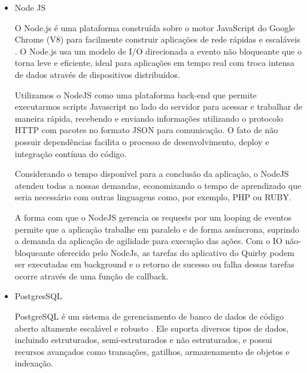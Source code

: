     \begin{itemize}
        \item Node JS
    
    O Node.js é uma plataforma construída sobre o motor JavaScript do Google Chrome (V8) para facilmente construir aplicações de rede rápidas e escaláveis \cite{nodejs_2019}. O Node.js usa um modelo de I/O direcionada a evento não bloqueante que o torna leve e eficiente, ideal para aplicações em tempo real com troca intensa de dados através de dispositivos distribuídos.
    
    Utilizamos o NodeJS como uma plataforma back-end que permite executarmos scripts Javascript no lado do servidor para acessar e trabalhar de maneira rápida, recebendo e enviando informações utilizando o protocolo HTTP com pacotes no formato JSON para comunicação. O fato de não possuir dependências facilita o processo de desenvolvimento, deploy e integração contínua do código.
    
    Considerando o tempo disponível para a conclusão da aplicação, o NodeJS atendeu todas a nossas demandas, economizando o tempo de aprendizado que seria necessário com outras linguagens como, por exemplo, PHP ou RUBY.
    
    A forma com que o NodeJS gerencia os requests por um looping de eventos permite que a aplicação trabalhe em paralelo e de forma assíncrona, suprindo a demanda da aplicação de agilidade para execução das ações. Com o IO não-bloqueante oferecido pelo NodeJs, as tarefas do aplicativo do Quirby podem ser executadas em background e o retorno de sucesso ou falha dessas tarefas ocorre através de uma função de callback.
    
    \item PostgresSQL
    
    PostgreSQL é um sistema de gerenciamento de banco de dados de código aberto altamente escalável e robusto \cite{POSTGRESSQL}. Ele suporta diversos tipos de dados, incluindo estruturados, semi-estruturados e não estruturados, e possui recursos avançados como transações, gatilhos, armazenamento de objetos e indexação. 
    

    

\end{itemize}
